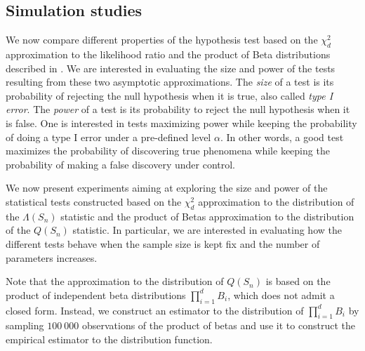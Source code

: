 \subsection{Simulation studies}

We now compare different properties of the hypothesis test based on the $\chi^2_d$ approximation to the likelihood ratio and the product of Beta distributions described in . We are interested in evaluating the size and power of the tests resulting from these two asymptotic approximations. The \textit{size} of a test is its probability of rejecting the null hypothesis when it is true, also called \textit{type I error}. The \textit{power} of a test is its probability to reject the null hypothesis when it is false. One is interested in tests maximizing power while keeping the probability of doing a type I error under a pre-defined level $\alpha$. In other words, a good test maximizes the probability of discovering true phenomena while keeping the probability of making a false discovery under control. 

We now present experiments aiming at exploring the size and power of the statistical tests constructed based on the $\chi^2_d$ approximation to the distribution of the $\Lambda(S_n)$ statistic and the product of Betas approximation to the distribution of the $Q(S_n)$ statistic. In particular, we are interested in evaluating how the different tests behave when the sample size is kept fix and the number of parameters increases.

Note that the approximation to the distribution of $Q(S_n)$ is based on the product of independent beta distributions $\prod_{i=1}^d B_i$, which does not admit a closed form. Instead, we construct an estimator to the distribution of $\prod_{i=1}^d B_i$ by sampling $100\ 000$ observations of the product of betas and use it to construct the empirical estimator to the distribution function.

